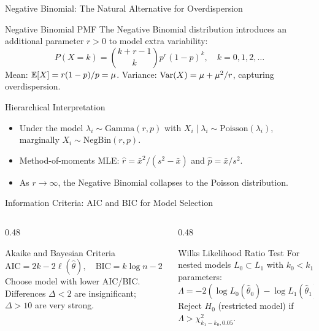 \documentclass[aspectratio=169,xcolor={dvipsnames,table}]{beamer}
\begin{document}
\begin{frame}{Negative Binomial: The Natural Alternative for Overdispersion}
	\vspace{-0.15cm}
	\begin{block}{Negative Binomial PMF}
		\footnotesize
		The Negative Binomial distribution introduces an additional parameter $r > 0$ to model extra variability:
		$$P(X = k) = \binom{k + r - 1}{k} p^{r} (1-p)^{k}, \quad k = 0, 1, 2, \dots$$
		Mean: $\mathbb{E}[X] = r(1-p)/p = \mu$. Variance: $\operatorname{Var}(X) = \mu + \mu^{2}/r$, capturing overdispersion.
	\end{block}
	\vspace{-0.1cm}
	\pause
	\begin{alertblock}{Hierarchical Interpretation}
		\footnotesize
		\begin{itemize}\itemsep=0.03cm
			\item Under the model $\lambda_{i} \sim \text{Gamma}(r, p)$ with $X_{i} \mid \lambda_{i} \sim \text{Poisson}(\lambda_{i})$, marginally $X_{i} \sim \text{NegBin}(r, p)$.
			\item Method-of-moments MLE: $\hat{r} = \bar{x}^{2}/(s^{2} - \bar{x})$ and $\hat{p} = \bar{x}/s^{2}$.
			\item As $r \to \infty$, the Negative Binomial collapses to the Poisson distribution.
		\end{itemize}
	\end{alertblock}
\end{frame}

\begin{frame}{Information Criteria: AIC and BIC for Model Selection}
	\vspace{-0.15cm}
	\begin{columns}[T]
		\begin{column}{0.48\textwidth}
			\begin{block}{Akaike and Bayesian Criteria}
				\footnotesize
				$$\text{AIC} = 2k - 2\ell(\hat{\theta}), \quad \text{BIC} = k \log n - 2\ell(\hat{\theta})$$
				Choose model with lower AIC/BIC. Differences $\Delta < 2$ are insignificant; $\Delta > 10$ are very strong.
			\end{block}
		\end{column}
		\begin{column}{0.48\textwidth}
			\begin{alertblock}{Wilks Likelihood Ratio Test}
				\footnotesize
				For nested models $L_0 \subset L_1$ with $k_0 < k_1$ parameters:
				$$\Lambda = -2(\log L_0(\hat{\theta}_0) - \log L_1(\hat{\theta}_1)) \xrightarrow{d} \chi^2_{k_1 - k_0}$$
				Reject $H_0$ (restricted model) if $\Lambda > \chi^2_{k_1 - k_0, 0.05}$.
			\end{alertblock}
		\end{column}
	\end{columns}
\end{frame}
\end{document}
